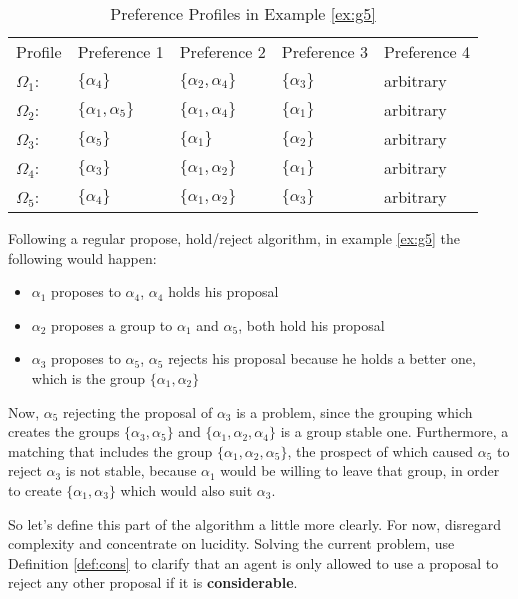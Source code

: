 \documentclass{elsarticle}
\begin{document}
\begin{table}[h]
\centering
\caption{Preference Profiles in Example \ref{ex:g5}}
\label{tab:g5}
\begin{tabular}{lllll}
Profile     & Preference 1              & Preference 2              & Preference 3   & Preference 4 \\
$\Omega_1$: & $\{\alpha_4\}$            & $\{\alpha_2 , \alpha_4\}$ & $\{\alpha_3\}$ & arbitrary    \\
$\Omega_2$: & $\{\alpha_1 , \alpha_5\}$ & $\{\alpha_1 , \alpha_4\}$ & $\{\alpha_1\}$ & arbitrary    \\
$\Omega_3$: & $\{\alpha_5\}$            & $\{\alpha_1\}$            & $\{\alpha_2\}$ & arbitrary    \\
$\Omega_4$: & $\{\alpha_3\}$            & $\{\alpha_1 , \alpha_2\}$ & $\{\alpha_1\}$ & arbitrary    \\
$\Omega_5$: & $\{\alpha_4\}$            & $\{\alpha_1 , \alpha_2\}$ & $\{\alpha_3\}$ & arbitrary   
\end{tabular}
\end{table}

Following a regular propose, hold/reject algorithm, in example \ref{ex:g5} the following would happen:

\begin{itemize}
\item $\alpha_1$ proposes to $\alpha_4$, $\alpha_4$ holds his proposal
\item $\alpha_2$ proposes a group to $\alpha_1$ and $\alpha_5$, both hold his proposal
\item $\alpha_3$ proposes to $\alpha_5$, $\alpha_5$ rejects his proposal because he holds a better one, which is the group $\{ \alpha_1 , \alpha_2 \}$
\end{itemize}

Now, $\alpha_5$ rejecting the proposal of $\alpha_3$ is a problem, since  the grouping which creates the groups $\{\alpha_3 , \alpha_5 \}$ and $\{ \alpha_1 , \alpha_2 , \alpha_4 \}$ is a group stable one. Furthermore, a matching that includes the group $\{ \alpha_1 , \alpha_2 , \alpha_5 \}$, the prospect of which caused $\alpha_5$ to reject $\alpha_3$ is not stable, because $\alpha_1$ would be willing to leave that group, in order to create $ \{ \alpha_1 , \alpha_3 \}$ which would also suit $\alpha_3$.

So let's define this part of the algorithm a little more clearly. For now, disregard complexity and concentrate on lucidity. Solving the current problem, use Definition \ref{def:cons} to clarify that an agent is only allowed to use a proposal to reject any other proposal if it is \textbf{considerable}.
\end{document}
